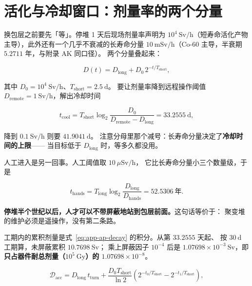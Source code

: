 \section{活化与冷却窗口：剂量率的两个分量}
\label{sec:app-ap-dose}

换包层之前要先「等」。停堆 1 天后现场剂量率声明为
$10^{4}\ \mathrm{Sv}/\mathrm{h}$（短寿命活化产物主导），此外还有一个几乎不衰减的长寿命分量
$10\ \mathrm{mSv}/\mathrm{h}$（Co-60 主导，半衰期 $5.2711$ 年，与附录 AK 同口径）。
两个分量叠起来：

\begin{equation}
D(t) = D_{\text{long}} + D_0\,2^{-t/T_{\text{short}}},
\label{eq:app-ap-decay}
\end{equation}

其中 $D_0 = 10^{4}\ \mathrm{Sv}/\mathrm{h}$、$T_{\text{short}} = 2.5\ \mathrm{d}$。
要让剂量率降到远程操作阈值 $D_{\text{remote}} = 1\ \mathrm{Sv}/\mathrm{h}$，解出冷却时间

\begin{equation}
t_{\text{cool}} = T_{\text{short}}\log_2\frac{D_0}{D_{\text{remote}} - D_{\text{long}}}
= 33.2555\ \mathrm{d},
\label{eq:app-ap-cooling}
\end{equation}

降到 $0.1\ \mathrm{Sv}/\mathrm{h}$ 则要 $41.9041\ \mathrm{d}$。
注意分母里那个减号：长寿命分量决定了\textbf{冷却时间的上限}——
当目标低于 $D_{\text{long}}$ 时，等多久都没用。

人工进入是另一回事。人工阈值取 $10\ \mu\mathrm{Sv}/\mathrm{h}$，
它比长寿命分量小三个数量级，于是

\begin{equation}
t_{\text{hands}} = T_{\text{long}}\log_2\frac{D_{\text{long}}}{D_{\text{hands}}}
= 52.5306\ \text{年}.
\label{eq:app-ap-hands}
\end{equation}

\textbf{停堆半个世纪以后，人才可以不带屏蔽地站到包层前面。}这句话等价于：
聚变堆的维护必须是遥操作，没有第二条路。

工期内的累积剂量是式~\eqref{eq:app-ap-decay} 的积分。从第 $33.2555$ 天起、
按 $30\ \mathrm{d}$ 工期算，未屏蔽累积 $10.7698\ \mathrm{Sv}$；
乘上屏蔽因子 $10^{-4}$ 后是 $1.07698\times10^{-3}\ \mathrm{Sv}$，即
\textbf{只占器件耐总剂量（$10^{5}\ \mathrm{Gy}$）的 $1.07698\times10^{-8}$}。

\begin{equation}
\mathcal{D}_{\text{acc}} = D_{\text{long}}\,t_{\text{turn}}
+ \frac{D_0 T_{\text{short}}}{\ln 2}
\left(2^{-t_0/T_{\text{short}}} - 2^{-t_1/T_{\text{short}}}\right),
\label{eq:app-ap-acc}
\end{equation}

